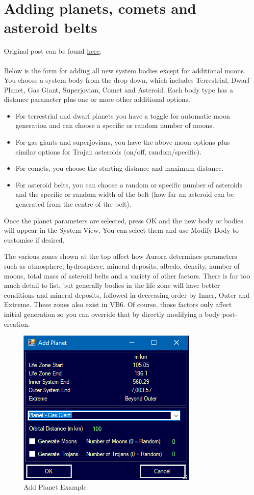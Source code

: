 \documentclass[../../Aurora C# unofficial manual.tex]{subfiles}
\begin{document}
	\section{Adding planets, comets and asteroid belts}\label{5_adding_planets_comets_asteroid}
	Original post can be found
	\href{http://aurora2.pentarch.org/index.php?topic=8495.msg118767#msg118767}{here}.
	\\\\
	
	Below is the form for adding all new system bodies except for additional moons. You choose a system body from the drop down, which includes Terrestrial, Dwarf Planet, Gas Giant, Superjovian, Comet and Asteroid. Each body type has a distance parameter plus one or more other additional options.
	\begin{itemize}
		\item For terrestrial and dwarf planets you have a toggle for automatic moon generation and can choose a specific or random number of moons.
		\item For gas giants and superjovians, you have the above moon options plus similar options for Trojan asteroids (on/off, random/specific).
		\item For comets, you choose the starting distance and maximum distance.
		\item For asteroid belts, you can choose a random or specific number of asteroids and the specific or random width of the belt (how far an asteroid can be generated from the centre of the belt).
	\end{itemize}
	
	Once the planet parameters are selected, press OK and the new body or bodies will appear in the System View. You can select them and use Modify Body to customise if desired.
	
	The various zones shown at the top affect how Aurora determines parameters such as atmosphere, hydrosphere, mineral deposits, albedo, density, number of moons, total mass of asteroid belts and a variety of other factors. There is far too much detail to list, but generally bodies in the life zone will have better conditions and mineral deposits, followed in decreasing order by Inner, Outer and Extreme. These zones also exist in VB6. Of course, those factors only affect initial generation so you can override that by directly modifying a body post-creation.
	\begin{figure}[H]
		\centering
		\includegraphics[width=0.5\linewidth]{images/AddPlanet}
		\caption[Add Planet Example]{Add Planet Example}
		\label{fig:addplanet}
	\end{figure}
\end{document}

